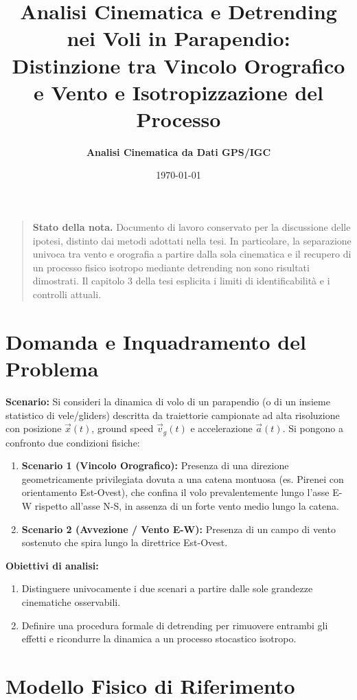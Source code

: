 \documentclass[11pt,a4paper]{article}
\title{\textbf{Analisi Cinematica e Detrending nei Voli in Parapendio:\\Distinzione tra Vincolo Orografico e Vento e Isotropizzazione del Processo}}
\author{\textbf{Analisi Cinematica da Dati GPS/IGC}}
\date{\today}
\begin{document}
\maketitle

\begin{quote}\small
\textbf{Stato della nota.} Documento di lavoro conservato per la discussione delle
ipotesi, distinto dai metodi adottati nella tesi. In particolare, la separazione
univoca tra vento e orografia a partire dalla sola cinematica e il recupero di un
processo fisico isotropo mediante detrending non sono risultati dimostrati.
Il capitolo 3 della tesi esplicita i limiti di identificabilit\`a e i controlli attuali.
\end{quote}

\section{Domanda e Inquadramento del Problema}

\textbf{Scenario:} Si consideri la dinamica di volo di un parapendio (o di un insieme statistico di vele/gliders) descritta da traiettorie campionate ad alta risoluzione con posizione $\vec{x}(t)$, ground speed $\vec{v}_g(t)$ e accelerazione $\vec{a}(t)$. Si pongono a confronto due condizioni fisiche:
\begin{enumerate}
    \item \textbf{Scenario 1 (Vincolo Orografico):} Presenza di una direzione geometricamente privilegiata dovuta a una catena montuosa (es. Pirenei con orientamento Est-Ovest), che confina il volo prevalentemente lungo l'asse E-W rispetto all'asse N-S, in assenza di un forte vento medio lungo la catena.
    \item \textbf{Scenario 2 (Avvezione / Vento E-W):} Presenza di un campo di vento sostenuto che spira lungo la direttrice Est-Ovest.
\end{enumerate}

\textbf{Obiettivi di analisi:}
\begin{enumerate}
    \item Distinguere univocamente i due scenari a partire dalle sole grandezze cinematiche osservabili.
    \item Definire una procedura formale di detrending per rimuovere entrambi gli effetti e ricondurre la dinamica a un processo stocastico isotropo.
\end{enumerate}

\section{Modello Fisico di Riferimento}
\end{document}
